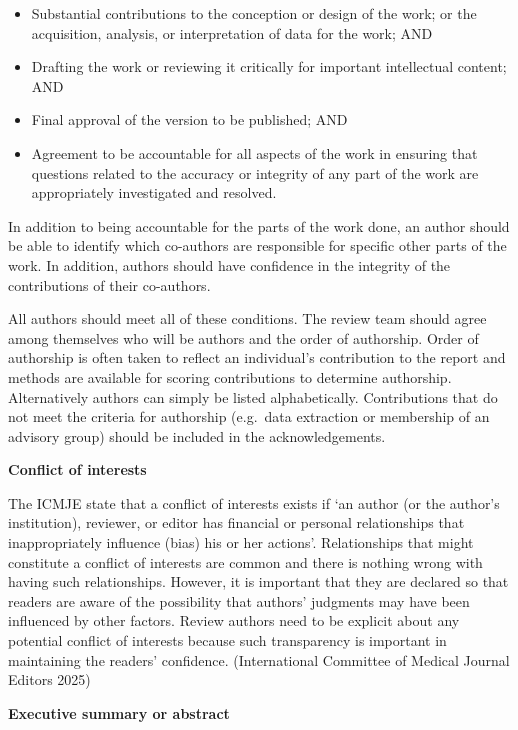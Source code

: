\documentclass[
  11pt,
  a4paper,
  DIV=11,
  numbers=noendperiod]{scrreprt}
\begin{document}
\begin{itemize}
\item
  Substantial contributions to the conception or design of the work; or
  the acquisition, analysis, or interpretation of data for the work; AND
\item
  Drafting the work or reviewing it critically for important
  intellectual content; AND
\item
  Final approval of the version to be published; AND
\item
  Agreement to be accountable for all aspects of the work in ensuring
  that questions related to the accuracy or integrity of any part of the
  work are appropriately investigated and resolved.
\end{itemize}

In addition to being accountable for the parts of the work done, an
author should be able to identify which co-authors are responsible for
specific other parts of the work. In addition, authors should have
confidence in the integrity of the contributions of their co-authors.

All authors should meet all of these conditions. The review team should
agree among themselves who will be authors and the order of authorship.
Order of authorship is often taken to reflect an individual's
contribution to the report and methods are available for scoring
contributions to determine authorship. Alternatively authors can simply
be listed alphabetically. Contributions that do not meet the criteria
for authorship (e.g.~data extraction or membership of an advisory group)
should be included in the acknowledgements.

\textbf{Conflict of interests}

The ICMJE state that a conflict of interests exists if `an author (or
the author's institution), reviewer, or editor has financial or personal
relationships that inappropriately influence (bias) his or her actions'.
Relationships that might constitute a conflict of interests are common
and there is nothing wrong with having such relationships. However, it
is important that they are declared so that readers are aware of the
possibility that authors' judgments may have been influenced by other
factors. Review authors need to be explicit about any potential conflict
of interests because such transparency is important in maintaining the
readers' confidence. (International Committee of Medical Journal Editors
2025)

\textbf{Executive summary or abstract}
\end{document}

